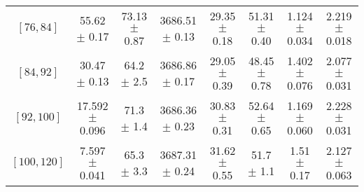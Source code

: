 \begin{tabular}{c||c|c|c|c|c|c|c}
$[76, 84]$ & 55.62 $\pm$ 0.17 & 73.13 $\pm$ 0.87 & 3686.51 $\pm$ 0.13 & 29.35 $\pm$ 0.18 & 51.31 $\pm$ 0.40 & 1.124 $\pm$ 0.034 & 2.219 $\pm$ 0.018\\
$[84, 92]$ & 30.47 $\pm$ 0.13 & 64.2 $\pm$ 2.5 & 3686.86 $\pm$ 0.17 & 29.05 $\pm$ 0.39 & 48.45 $\pm$ 0.78 & 1.402 $\pm$ 0.076 & 2.077 $\pm$ 0.031\\
$[92, 100]$ & 17.592 $\pm$ 0.096 & 71.3 $\pm$ 1.4 & 3686.36 $\pm$ 0.23 & 30.83 $\pm$ 0.31 & 52.64 $\pm$ 0.65 & 1.169 $\pm$ 0.060 & 2.228 $\pm$ 0.031\\
$[100, 120]$ & 7.597 $\pm$ 0.041 & 65.3 $\pm$ 3.3 & 3687.31 $\pm$ 0.24 & 31.62 $\pm$ 0.55 & 51.7 $\pm$ 1.1 & 1.51 $\pm$ 0.17 & 2.127 $\pm$ 0.063\\
\end{tabular}
